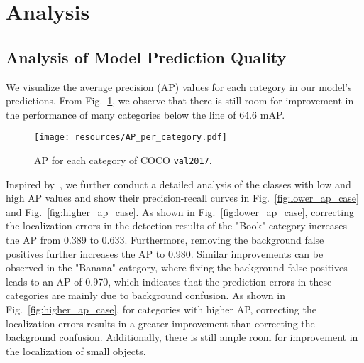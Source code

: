 \documentclass{article}
\begin{document}
  \begin{table*}[ht]
\centering\setlength{\tabcolsep}{7pt}
\renewcommand{\arraystretch}{1.5}
\footnotesize
\vspace{-0mm}
\end{table*}
   
 \section{Analysis}
\subsection{Analysis of Model Prediction Quality}
We visualize the average precision (AP) values for each category in our model's predictions. From Fig.~\ref{fig:ap_per_category}, we observe that there is still room for improvement in the performance of many categories below the line of 64.6 mAP.
\begin{figure}[h]
    \centering
\texttt{[image: resources/AP\_per\_category.pdf]}
    \vspace{-0.2cm}
    \caption{AP for each category of COCO \texttt{val2017}.
    }
    \label{fig:ap_per_category}
\end{figure} 


Inspired by~\cite{hoiem2012diagnosing}, we further conduct a detailed analysis of the classes with low and high AP values and show their precision-recall curves in Fig.~\ref{fig:lower_ap_case} and Fig.~\ref{fig:higher_ap_case}. As shown in Fig.~\ref{fig:lower_ap_case}, correcting the localization errors in the detection results of the "Book" category increases the AP from 0.389 to 0.633. Furthermore, removing the background false positives further increases the AP to 0.980. Similar improvements can be observed in the "Banana" category, where fixing the background false positives leads to an AP of 0.970, which indicates that the prediction errors in these categories are mainly due to background confusion. As shown in Fig.~\ref{fig:higher_ap_case}, for categories with higher AP, correcting the localization errors results in a greater improvement than correcting the background confusion. Additionally, there is still ample room for improvement in the localization of small objects.
\end{document}
